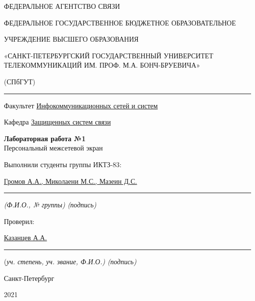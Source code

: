 \documentclass[a4paper,14pt]{extarticle}
\begin{document}
    \begin{center}
        \thispagestyle{empty}
        \begin{singlespace}
        ФЕДЕРАЛЬНОЕ АГЕНТСТВО СВЯЗИ

        ФЕДЕРАЛЬНОЕ ГОСУДАРСТВЕННОЕ БЮДЖЕТНОЕ ОБРАЗОВАТЕЛЬНОЕ

        УЧРЕЖДЕНИЕ ВЫСШЕГО ОБРАЗОВАНИЯ

        «САНКТ-ПЕТЕРБУРГСКИЙ ГОСУДАРСТВЕННЫЙ УНИВЕРСИТЕТ ТЕЛЕКОММУНИКАЦИЙ ИМ. ПРОФ. М.А. БОНЧ-БРУЕВИЧА»

        (СПбГУТ)
        \end{singlespace}
        \vspace{-1ex}
        \rule{\textwidth}{0.4pt}
        \vspace{-5ex}

        Факультет \underline{Инфокоммуникационных сетей и систем}

        Кафедра \underline{Защищенных систем связи}
        \vspace{10ex}

        \textbf{Лабораторная работа №1}\\
        Персональный межсетевой экран
        


    \end{center}
    \vspace{4ex}
    \begin{flushright}
    \parbox{10 cm}{
    \begin{flushleft}
        Выполнили студенты группы ИКТЗ-83:

        \underline{Громов А.А., Миколаени М.С., Мазеин Д.С.} \hfill \rule[-0.85ex]{0.1\textwidth}{0.6pt}

        \footnotesize \textit{ (Ф.И.О., № группы) \hfill (подпись)} \normalsize

        Проверил:

        \underline{Казанцев А.А.} \hfill \rule[-0.85ex]{0.1\textwidth}{0.6pt}

        (\footnotesize \textit{уч. степень, уч. звание, Ф.И.О.) \hfill (подпись)} \normalsize

    \end{flushleft}
    }
    \end{flushright}
    \begin{center}
        \vfill
        Санкт-Петербург

        2021

    \end{center}
    \newpage
\end{document}
